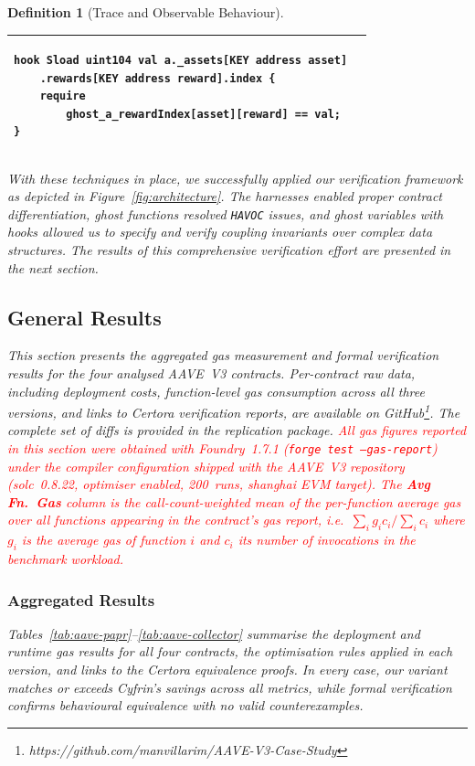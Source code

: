 \documentclass[manuscript,screen,review]{acmart}
\newcommand{\mfav}[1]{\textcolor{red}{#1}}
\newtheorem{definition}{Definition}
\begin{document}
\begin{definition}[Trace and Observable Behaviour]
\begin{table}[htb]
\begin{tabular}{|p{}|p{}|}
\begin{verbatim}
hook Sload uint104 val a._assets[KEY address asset]
    .rewards[KEY address reward].index {
    require 
        ghost_a_rewardIndex[asset][reward] == val;
}
\end{verbatim}
\\ \hline
\end{tabular}
\end{table}

With these techniques in place, we successfully applied our verification framework as depicted in Figure~\ref{fig:architecture}. The harnesses enabled proper contract differentiation, ghost functions resolved \texttt{HAVOC} issues, and ghost variables with hooks allowed us to specify and verify coupling invariants over complex data structures. The results of this comprehensive verification effort are presented in the next section.

\subsection{General Results}
\label{sec:general_results}

This section presents the aggregated gas measurement and formal verification
results for the four analysed AAVE~V3 contracts. Per-contract raw data,
including deployment costs, function-level gas consumption across all three
versions, and links to Certora verification reports, are available on GitHub\footnote{https://github.com/manvillarim/AAVE-V3-Case-Study}.
The complete set of diffs is provided in the replication package.
\mfav{All gas figures reported in this section were obtained with Foundry~1.7.1
(\texttt{forge test --gas-report}) under the compiler configuration shipped
with the AAVE~V3 repository (solc~0.8.22, optimiser enabled, 200~runs,
\textit{shanghai} EVM target). The \textbf{Avg Fn.\ Gas} column is the call-count-weighted mean of
the per-function average gas over all functions appearing in the contract's
gas report, i.e.\ $\sum_i g_i c_i / \sum_i c_i$ where $g_i$ is the average
gas of function $i$ and $c_i$ its number of invocations in the benchmark
workload.}
\subsubsection{Aggregated Results}
\label{sssec:aggregated}

Tables~\ref{tab:aave-papr}--\ref{tab:aave-collector} summarise the
deployment and runtime gas results for all four contracts, the
optimisation rules applied in each version, and links to the Certora
equivalence proofs. In every case, our variant matches or exceeds
Cyfrin's savings across all metrics, while formal verification confirms
behavioural equivalence with no valid counterexamples.


\end{definition}
\end{document}
